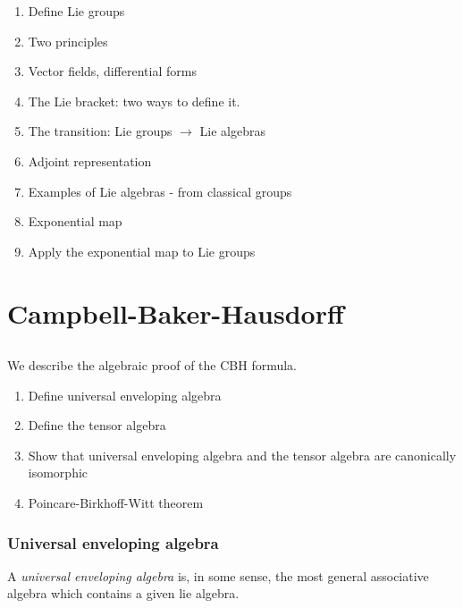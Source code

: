 \begin{enumerate}
    \makethislistcompact
    \item Define Lie groups
    \item Two principles
    \item Vector fields, differential forms
    \item The Lie bracket: two ways to define it.
    \item The transition: Lie groups $\to$  Lie algebras
    \item Adjoint representation
    \item Examples of Lie algebras - from classical groups
    \item Exponential map
    \item Apply the exponential map to Lie groups
\end{enumerate}




\chapter{Campbell-Baker-Hausdorff}
\section{}
We describe the algebraic proof of the CBH formula. 

\begin{enumerate}
    \makethislistcompact
    \item Define universal enveloping algebra
    \item Define the tensor algebra
    \item Show that universal enveloping algebra and the tensor algebra are canonically isomorphic
    \item Poincare-Birkhoff-Witt theorem
\end{enumerate}

\subsection{Universal enveloping algebra}
\label{sub:universal_enveloping_algebra}

A \emph{universal enveloping algebra} is, in some sense, the most general associative algebra which contains a given lie algebra. 

